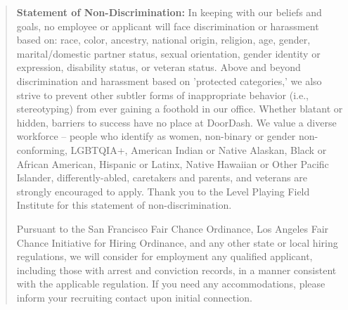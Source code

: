 \begin{quote}
    \textbf{Statement of Non-Discrimination:} In keeping with our beliefs and goals, no employee or applicant will face discrimination or harassment based on: race, color, ancestry, national origin, religion, age, gender, marital/domestic partner status, sexual orientation, gender identity or expression, disability status, or veteran status. Above and beyond discrimination and harassment based on 'protected categories,' we also strive to prevent other subtler forms of inappropriate behavior (i.e., stereotyping) from ever gaining a foothold in our office. Whether blatant or hidden, barriers to success have no place at DoorDash. We value a diverse workforce – people who identify as women, non-binary or gender non-conforming, LGBTQIA+, American Indian or Native Alaskan, Black or African American, Hispanic or Latinx, Native Hawaiian or Other Pacific Islander, differently-abled, caretakers and parents, and veterans are strongly encouraged to apply. Thank you to the Level Playing Field Institute for this statement of non-discrimination.
    
    Pursuant to the San Francisco Fair Chance Ordinance, Los Angeles Fair Chance Initiative for Hiring Ordinance, and any other state or local hiring regulations, we will consider for employment any qualified applicant, including those with arrest and conviction records, in a manner consistent with the applicable regulation. If you need any accommodations, please inform your recruiting contact upon initial connection.
\end{quote}

